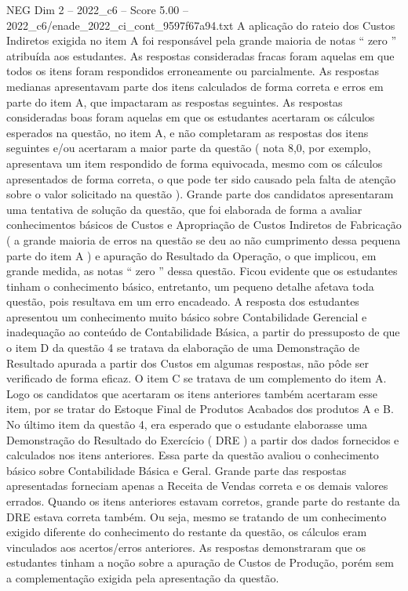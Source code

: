 \begin{textsample}{NEG Dim 2 – 2022\_c6 – Score 5.00 – 2022\_c6/enade\_2022\_ci\_cont\_9597f67a94.txt}
A aplicação do rateio dos Custos Indiretos exigida no item A foi responsável pela grande maioria de notas “ zero ” atribuída aos estudantes.
As respostas consideradas fracas foram aquelas em que todos os itens foram respondidos erroneamente ou parcialmente.
As respostas medianas apresentavam parte dos itens calculados de forma correta e erros em parte do item A, que impactaram as respostas seguintes.
As respostas consideradas boas foram aquelas em que os estudantes acertaram os cálculos esperados na questão, no item A, e não completaram as respostas dos itens seguintes e/ou acertaram a maior parte da questão ( nota 8,0, por exemplo, apresentava um item respondido de forma equivocada, mesmo com os cálculos apresentados de forma correta, o que pode ter sido causado pela falta de atenção sobre o valor solicitado na questão ).
Grande parte dos candidatos apresentaram uma tentativa de solução da questão, que foi elaborada de forma a avaliar conhecimentos básicos de Custos e Apropriação de Custos Indiretos de Fabricação ( a grande maioria de erros na questão se deu ao não cumprimento dessa pequena parte do item A ) e apuração do Resultado da Operação, o que implicou, em grande medida, as notas “ zero ” dessa questão.
Ficou evidente que os estudantes tinham o conhecimento básico, entretanto, um pequeno detalhe afetava toda questão, pois resultava em um erro encadeado.
A resposta dos estudantes apresentou um conhecimento muito básico sobre Contabilidade Gerencial e inadequação ao conteúdo de Contabilidade Básica, a partir do pressuposto de que o item D da questão 4 se tratava da elaboração de uma Demonstração de Resultado apurada a partir dos Custos em algumas respostas, não pôde ser verificado de forma eficaz.
O item C se tratava de um complemento do item A.
Logo os candidatos que acertaram os itens anteriores também acertaram esse item, por se tratar do Estoque Final de Produtos Acabados dos produtos A e B.
No último item da questão 4, era esperado que o estudante elaborasse uma Demonstração do Resultado do Exercício ( DRE ) a partir dos dados fornecidos e calculados nos itens anteriores.
Essa parte da questão avaliou o conhecimento básico sobre Contabilidade Básica e Geral.
Grande parte das respostas apresentadas forneciam apenas a Receita de Vendas correta e os demais valores errados.
Quando os itens anteriores estavam corretos, grande parte do restante da DRE estava correta também.
Ou seja, mesmo se tratando de um conhecimento exigido diferente do conhecimento do restante da questão, os cálculos eram vinculados aos acertos/erros anteriores.
As respostas demonstraram que os estudantes tinham a noção sobre a apuração de Custos de Produção, porém sem a complementação exigida pela apresentação da questão.

\end{textsample}
